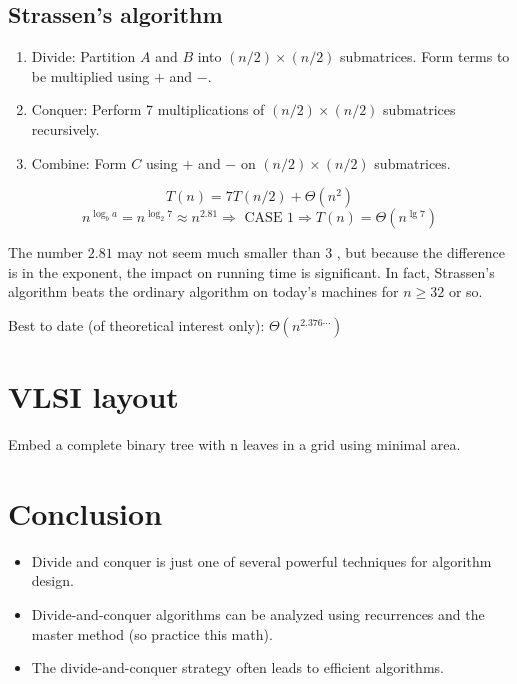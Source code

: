 \documentclass[11pt,toc=twocol]{elegantbook}
\begin{document}
\subsection{Strassen’s algorithm}
\begin{enumerate}
    \item Divide: Partition $A$ and $B$ into $(n / 2) \times(n / 2)$ submatrices. Form terms to be multiplied using $+$ and $-$.
    \item Conquer: Perform 7 multiplications of $(n / 2) \times(n / 2)$ submatrices recursively.
    \item Combine: Form $C$ using $+$ and $-$ on $(n / 2) \times(n / 2)$ submatrices.
\end{enumerate}
$$
T(n)=7 T(n / 2)+\Theta\left(n^{2}\right)
$$
$$
n^{\log _{b} a}=n^{\log _{2} 7} \approx n^{2.81} \Rightarrow \text { CASE } 1 \Rightarrow T(n)=\Theta\left(n^{\lg 7}\right)
$$
\begin{note}
    The number $2.81$ may not seem much smaller than 3 , but because the difference is in the exponent, the impact on running time is significant. In fact, Strassen's algorithm beats the ordinary algorithm on today's machines for $n \geq 32$ or so.
\end{note}
\begin{note}
    Best to date (of theoretical interest only): $\Theta\left(n^{2.376 \cdots}\right)$
\end{note}
\section{VLSI layout}
\begin{problem}
    Embed a complete binary tree with n leaves in a grid using minimal area.
\end{problem}
\section{Conclusion}

\begin{itemize}
    \item Divide and conquer is just one of several powerful techniques for algorithm design.
    \item Divide-and-conquer algorithms can be analyzed using recurrences and the master method (so practice this math).
    \item The divide-and-conquer strategy often leads to efficient algorithms.
\end{itemize}
\end{document}
